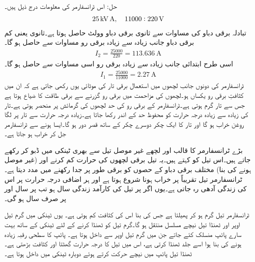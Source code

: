 حل:	اس ٹرانسفارمر کی معلومات درج ذیل ہیں۔
\begin{align*}
\SI{25}{\kilo \volt \ampere}, \quad 11000:220\,\textup{V}
\end{align*}
تبادلہ برقی دباو کی مساوات سے  ثانوی  برقی دباو    وولٹ حاصل ہوتا ہے۔ثانوی  یعنی کم برقی دباو  جانب زیادہ سے زیادہ برقی رو مساوات   سے حاصل ہو گا۔
\begin{align*}
I_2=\frac{25000}{220}=\SI{113.636}{\ampere}
\end{align*}
اسی طرح  ابتدائی جانب زیادہ سے زیادہ برقی رو اسی مساوات سے حاصل ہو گا۔
\begin{align*}
I_1=\frac{25000}{11000}=\SI{2.27}{\ampere}
\end{align*}
%
ٹرانسفارمر کی دونوں جانب لچھوں میں استعمال برقی تار کی موٹائی یوں رکھی جاتی ہے کہ ان میں کثافتِ برقی رو  یکساں ہو۔لچھوں کی مزاحمت میں برقی رو گزرنے سے برقی طاقت کا ضیاع ہوتا ہے جس سے تار گرم ہوتی ہے۔ٹرانسفارمر کے برقی رو کی حد لچھوں کی گرمائش پر منحصر ہوتی ہے۔تار کی زیادہ سے زیادہ درجہ حرارت کو محفوظ حد کے اندر رکھا جاتا ہے۔زیادہ درجہ حرارت سے تار پر لگا روغن خراب ہو گا اور تار کا ایک چکر دوسرے چکر کے ساتھ قصر دور ہو گا۔ایسا ہونے سے ٹرانسفارمر جل کر خراب ہو جاتا ہے۔ 

بڑے ٹرانسفارمر کا قالب اور لچھے  غیر موصل تیل سے بھری ٹینکی میں ڈبو کر رکھے جاتے ہیں۔اس تیل کو  کہتے ہیں۔یہ تیل برقی لچھوں کی حرارت کم کرنے  اور   (غیر موصل ہونے کی بنا) مختلف برقی دباو کے حصوں کو برقی طور پر جدا رکھنے میں مدد دیتا ہے۔ٹرانسفارمر تیل تقریباً   پر خراب ہونا شروع ہوتا ہے اور ہر  اضافی درجہ حرارت پر اس کی زندگی آدھی رہ جاتی ہے۔یوں اگر  پر تیل کی کارآمد زندگی  سال ہو تب  پر  سال اور   پر  صرف   سال ہو گی۔

ٹرانسفارمر  تیل گرم ہو کر پھیلتا ہے جس کی بنا اس کی کثافت کم ہوتی ہے۔ یوں  ٹینکی میں گرم تیل اوپر اور ٹھنڈا تیل نیچے مسلسل منتقل ہو گا۔گرم تیل کو ٹھنڈا کرنے کے لئے ٹینکی کے ساتھ بہت سارے پائپ منسلک کئے جاتے جن میں  گرم تیل  اوپر سے  داخل ہوتا ہے۔ پائپ کا سطحی رقبہ زیادہ ہونے کی بنا ہوا اسے جلد ٹھنڈا کرتی ہے،  اس میں تیل کا درجہ حرارت گھٹتا اور  کثافت بڑھتی ہے۔ٹھنڈا تیل پائپ میں نیچے حرکت کرتے ہوئے دوبارہ ٹینکی میں داخل ہوتا ہے۔

